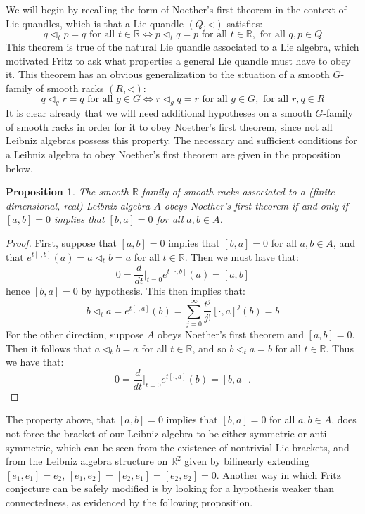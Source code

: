 \documentclass[12pt]{amsart}
\theoremstyle{plain}
\newtheorem{proposition}[theorem]{Proposition}
\theoremstyle{definition}
\begin{document}
We will begin by recalling the form of Noether's first theorem in the context of Lie quandles, which is that a Lie quandle $(Q,\triangleleft)$ satisfies:
$$    q \triangleleft_t p = q \text{ for all } t \in \mathbb{R}    \iff  p \triangleleft_t q = p \text{ for all } t \in \mathbb{R} ,  \text{ for all }q,p \in Q  $$
This theorem is true of the natural Lie quandle associated to a Lie algebra, which motivated Fritz to ask what properties a general Lie quandle must have to obey it. This theorem has an obvious generalization to the situation of a smooth $G$-family of smooth racks $(R,\triangleleft)$:
 $$  q \triangleleft_g r = q \text{ for all } g \in G   \iff  r \triangleleft_g q = r \text{ for all } g \in G ,  \text{ for all }r,q \in R   $$
It is clear already that we will need additional hypotheses on a smooth $G$-family of smooth racks in order for it to obey Noether's first theorem, since not all Leibniz algebras possess this property. The necessary and sufficient conditions for a Leibniz algebra to obey Noether's first theorem are given in the proposition below.


\vspace{5mm}


\begin{proposition}
The smooth $\mathbb{R}$-family of smooth racks associated to a (finite dimensional, real) Leibniz algebra $A$ obeys Noether's first theorem if and only if $[a,b]=0$ implies that $[b,a]=0$ for all $a,b \in A$.    
\end{proposition}

\begin{proof}
     First, suppose that $[a,b]=0$ implies that $[b,a]=0$ for all $a,b \in A$, and that $e^{t[\cdot,b]}(a) = a \triangleleft_t b = a $ for all $ t \in \mathbb{R} $. Then we must have that:
$$ 0 = \frac{d}{dt}\bigg|_{t=0}e^{t[\cdot,b]}(a)  = [a,b]  $$
hence $[b,a]=0$ by hypothesis. This then implies that:
$$ b \triangleleft_t a = e^{t[\cdot,a]}(b) = \sum_{j=0}^\infty \frac{t^j}{j!} [\cdot,a]^j(b) = b  $$
For the other direction, suppose $A$ obeys Noether's first theorem and $[a,b] =0$. Then it follows that $ a \triangleleft_t b = a $ for all $t \in \mathbb{R}$, and so $b\triangleleft_t a =b$ for all $t \in \mathbb{R}$. Thus we have that:
$$ 0 = \frac{d}{dt}\bigg|_{t=0}e^{t[\cdot,a]}(b) = [b,a]. $$\end{proof}

\vspace{5mm}


The property above, that $[a,b]=0$ implies that $[b,a]=0$ for all $a,b \in A$, does not force the bracket of our Leibniz algebra to be either symmetric or anti-symmetric, which can be seen from the existence of nontrivial Lie brackets, and from the Leibniz algebra structure on $\mathbb{R}^2$ given by bilinearly extending $[e_1,e_1]=e_2$, $[e_1,e_2]=[e_2,e_1]=[e_2,e_2]=0$. Another way in which Fritz conjecture can be safely modified is by looking for a hypothesis weaker than connectedness, as evidenced by the following proposition.
\end{document}
